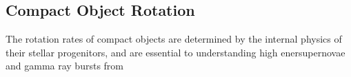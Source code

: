 {\color{orange}

\subsection{Compact Object Rotation}

The rotation rates of compact objects are determined by the internal physics of their stellar progenitors, and are essential to understanding high enersupernovae and gamma ray bursts from 

}